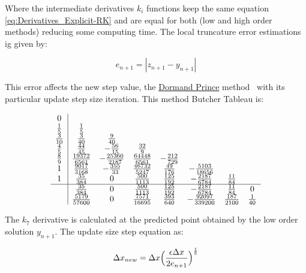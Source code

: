 Where the intermediate derivatives \(k_i\) functions keep the same equation \ref{eq:Derivatives_Explicit-RK} and are equal for both (low and high order methods) reducing some computing time. The local truncature error estimations ig given by:

\begin{equation}
    e_{n+1} = |z_{n+1} - y_{n+1}|
    \label{eq:Local_Truncature_Erro_Estimation_AdaptiveRK}
\end{equation}

This error affects the new step value, the \underline{Dormand Prince} method~\cite{kimura2009dormand} with its particular update step size iteration. This method Butcher Tableau is:

\begin{equation}
    \begin{array}{c|ccccccc}
        0\\
        \frac{1}{5} & \frac{1}{5}\\
        \frac{3}{10} & \frac{3}{40} & \frac{9}{40} \\
        \frac{4}{5} & \frac{44}{45} & -\frac{56}{15} & \frac{32}{9}\\
        \frac{8}{9} & \frac{19372}{6561} & -\frac{25360}{2187} & \frac{64448}{6561} & -\frac{212}{729}\\
        1 & \frac{9017}{3168} & -\frac{355}{33} & \frac{46732}{5247} & \frac{49}{176} & -\frac{5103}{18656}\\
        1 & \frac{35}{384} & 0 & \frac{500}{1113} & \frac{125}{192} & -\frac{2187}{6784} & \frac{11}{84}\\
        \hline
        & \frac{35}{384} & 0 & \frac{500}{1113} & \frac{125}{192} & -\frac{2187}{6784} & \frac{11}{84} & 0  \\
        & \frac{5179}{57600} & 0 & \frac{7571}{16695} & \frac{393}{640} & -\frac{92097}{339200} & \frac{187}{2100} & \frac{1}{40}  
    \end{array}
    \label{eq:Dormand-Prince_Tableu}
\end{equation}

The \(k_7\) derivative is calculated at the predicted point obtained by the low order solution \(y_{n+1}\). The update size step equation as:

\begin{equation}
    \Delta x_{new} = \Delta x \Bigl( \frac{\epsilon\Delta x}{2e_{n+1}}\Bigr)^{\frac{1}{5}}
    \label{eq:Update_Size_Step_Equation}
\end{equation}

